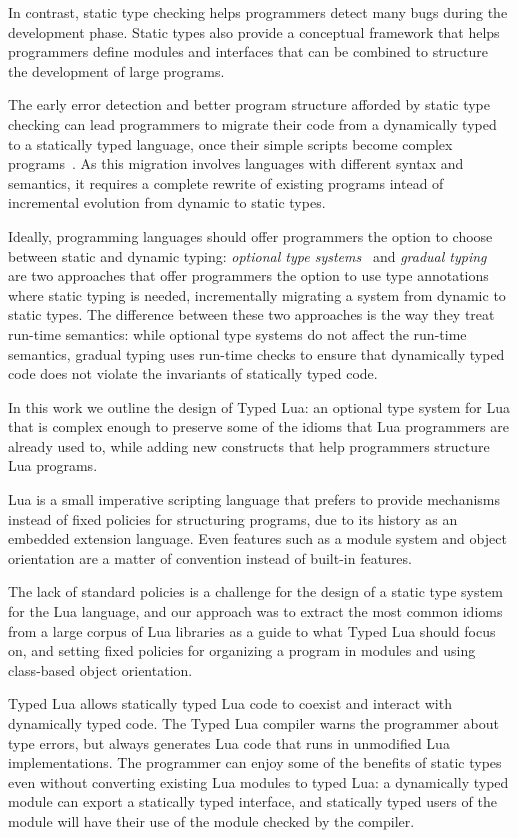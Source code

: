 \documentclass[preprint]{sig-alternate}
\begin{document}
In contrast, static type checking helps programmers detect many 
bugs during the development phase. Static types also provide a
conceptual framework that helps programmers define modules
and interfaces that can be combined to structure the development
of large programs.

The early error detection and better program structure afforded by
static type checking can lead programmers to migrate their code from
a dynamically typed to a statically typed language, once their simple
scripts become complex programs~\citep{tobin-hochstadt2006ims}.
As this migration involves languages with different syntax and
semantics, it requires a complete rewrite of existing programs intead
of incremental evolution from dynamic to static types.

Ideally, programming languages should offer programmers the
option to choose between static and dynamic typing:
\textit{optional type systems}~\citep{bracha2004pluggable} and
\textit{gradual typing}~\citep{siek2006gradual} are two approaches
that offer programmers the option to use type annotations where static
typing is needed, incrementally migrating a system from dynamic
to static types. The difference between these two approaches is the
way they treat run-time semantics: while optional type systems
do not affect the run-time semantics,
gradual typing uses run-time checks to ensure that dynamically typed
code does not violate the invariants of statically typed code.

In this work we outline the design of Typed Lua:
an optional type system for Lua that is complex enough to
preserve some of the idioms that Lua programmers are already used to,
while adding new constructs that help programmers structure Lua
programs.

Lua is a small imperative scripting language that prefers to provide
mechanisms instead of fixed policies for structuring programs,
due to its history as an embedded extension language. Even features
such as a module system and object orientation are a matter of 
convention instead of built-in features.

The lack of standard policies
is a challenge for the design of a static type system for the Lua
language, and our approach was to extract the most common
idioms from a large corpus of Lua libraries as a guide to what
Typed Lua should focus on, and setting fixed policies for organizing
a program in modules and using class-based object orientation.

Typed Lua allows statically typed Lua code to coexist and interact with 
dynamically typed code. The Typed Lua compiler warns the programmer
about type errors, but always generates Lua code that runs in unmodified
Lua implementations. The programmer can enjoy some of the benefits
of static types even without converting existing Lua modules to typed Lua:
a dynamically typed module can export a statically typed interface, and
statically typed users of the module will have their use of the module
checked by the compiler.
\end{document}
